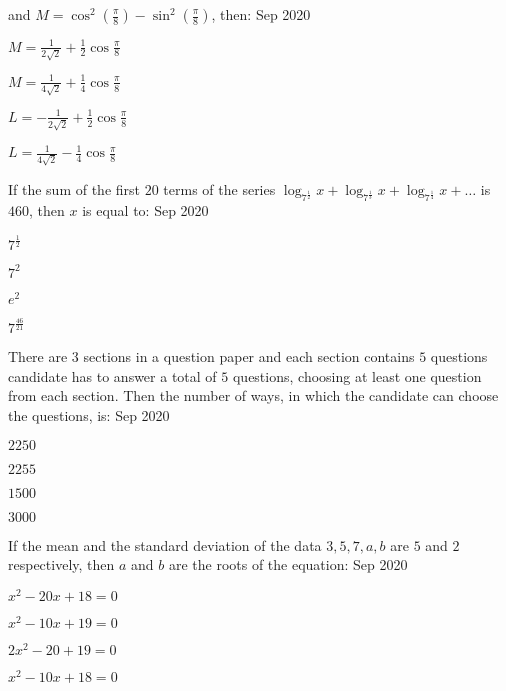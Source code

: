  and $M = \cos^2\left(\frac{\pi}{8}\right) - \sin^2\left(\frac{\pi}{8}\right)$, then:  
		\hfill{Sep 2020}
 \begin{enumerate}  
 \end{enumerate}
 \item If the sum of the first $20$ terms of the series $\log_{{7}^{\frac{1}{2}}} x + \log_{{7}^{\frac{1}{3}}} x + \log_{{7}^{\frac{1}{4}}} x + \dots$ is $460$, then $x$ is equal to:
	 \hfill{Sep 2020}
 \begin{enumerate}
 \begin{multicols}{4}
 \item ${7}^{\frac{1}{2}}$
 \item ${7}^{2}$
 \item ${e}^{2}$
\item ${7}^{\frac{46}{21}}$
 \end{multicols}
 \end{enumerate} 
 \item There are $3$ sections in a question paper and each section contains $5$ questions candidate has to answer a total of $5$ questions, choosing at least one question from each section. Then the number of ways, in which the candidate can choose the questions, is:
	 \hfill{Sep 2020}
 \begin{enumerate}
 \begin{multicols}{4}
     \item $2250$
     \item $2255$
     \item $1500$
     \item $3000$
\end{multicols}
     \end{enumerate}
     \item If the mean and the standard deviation of the data $3,5,7,a,b$ are $5$ and $2$ respectively, then $a$ and $b$ are the roots of the equation:
	     \hfill{Sep 2020}
     \begin{enumerate}
    \begin{multicols}{2}
\item $x^{2}-20x+18=0$
\item $x^{2}-10x+19=0$
\item $2x^{2}-20+19=0$
\item $x^{2}-10x+18=0$
     \end{multicols}
     \end{enumerate}
